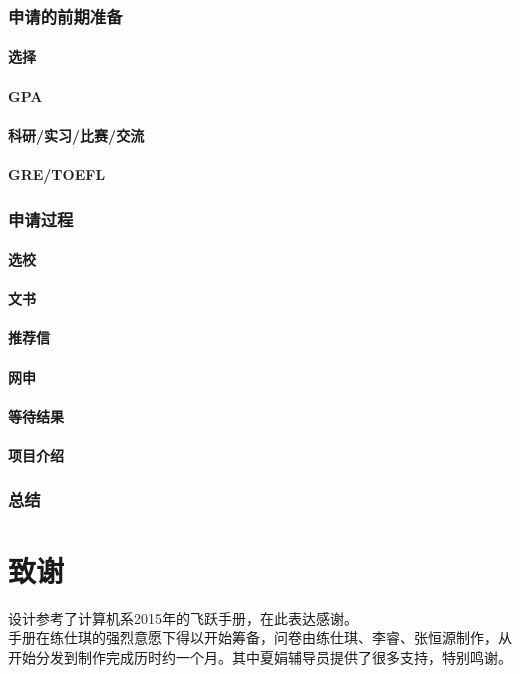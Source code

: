 \documentclass[a4paper,UTF8]{book}
\begin{document}
    \subsection*{申请的前期准备}
        \subsubsection*{选择}
        \subsubsection*{GPA}
        \subsubsection*{科研/实习/比赛/交流}
        \subsubsection*{GRE/TOEFL}

    \subsection*{申请过程}
        \subsubsection*{选校}
        \subsubsection*{文书}
        \subsubsection*{推荐信}
        \subsubsection*{网申}
        \subsubsection*{等待结果}
        \subsubsection*{项目介绍}

    \subsection*{总结}
    

\chapter{致谢}
设计参考了计算机系2015年的飞跃手册，在此表达感谢。\\
手册在练仕琪的强烈意愿下得以开始筹备，问卷由练仕琪、李睿、张恒源制作，从开始分发到制作完成历时约一个月。其中夏娟辅导员提供了很多支持，特别鸣谢。
\end{document}
